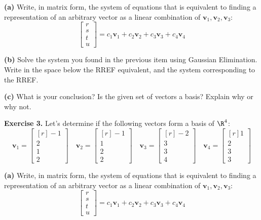 \documentclass[12pt]{article}
\begin{document}
\textbf{(a)} Write, in matrix form, the system of equations that is equivalent to finding a representation of an arbitrary vector as a linear combination of $\mathbf{v}_1,\mathbf{v}_2,\mathbf{v}_3$:
\[
\begin{bmatrix} r \\ s \\ t \\ u\end{bmatrix} = c_1\mathbf{v}_1+c_2\mathbf{v}_2+c_3\mathbf{v}_3+c_4\mathbf{v}_4
\]

\vskip2in

\textbf{(b)} Solve the system you found in the previous item using Gaussian Elimination. Write in the space below the RREF equivalent, and the system corresponding to the RREF.

\vskip2.8in

\textbf{(c)} What is your conclusion? Is the given set of vectors a basis? Explain why or why not.

\clearpage

\textbf{Exercise 3.} Let's determine if the following vectors form a basis of $\R^4$:
\[
\mathbf{v}_1=\begin{bmatrix*}[r] -1  \\ 2 \\ 1 \\ 2 \end{bmatrix*}\quad
\mathbf{v}_2=\begin{bmatrix*}[r] -1  \\ 1 \\ 2  \\ 2\end{bmatrix*}\quad
\mathbf{v}_3=\begin{bmatrix*}[r] -2 \\ 3 \\ 3 \\ 4 \end{bmatrix*}\quad
\mathbf{v}_4=\begin{bmatrix*}[r] 1 \\ 2 \\ 3 \\ 3 \end{bmatrix*}
\]

\textbf{(a)} Write, in matrix form, the system of equations that is equivalent to finding a representation of an arbitrary vector as a linear combination of $\mathbf{v}_1,\mathbf{v}_2,\mathbf{v}_3$:
\[
\begin{bmatrix} r \\ s \\ t \\ u\end{bmatrix} = c_1\mathbf{v}_1+c_2\mathbf{v}_2+c_3\mathbf{v}_3+c_4\mathbf{v}_4
\]
\end{document}
